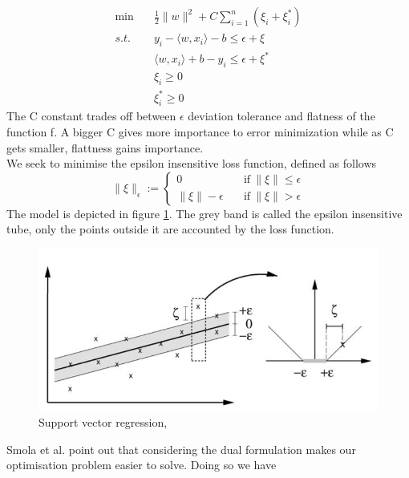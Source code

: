 \begin{equation}
    \begin{aligned}
        \min \quad& \frac{1}{2}\|w\|^2+C\sum\limits_{i=1}^n(\xi_i+\xi_i^*)
        \\
        s.t. \quad& y_i-\langle w, x_i\rangle-b\leq \epsilon+\xi
        \\
        \quad& \langle w, x_i\rangle +b-y_i\leq \epsilon+\xi^*
        \\
        \quad& \xi_i\geq0
        \\
        \quad& \xi_i^*\geq0
    \end{aligned}
\end{equation}
The C constant trades off between $\epsilon$ deviation tolerance and flatness of the function f. A bigger C gives more importance to error minimization while as C gets smaller, flattness gains importance.
\\
We seek to minimise the epsilon insensitive loss function, defined as follows
\begin{equation}
    \|\xi\|_\epsilon:=\begin{cases}
        0 \quad& \textrm{if} \ \|\xi\|\leq \epsilon
        \\
        \|\xi\|-\epsilon \quad& \textrm{if} \ \|\xi\| > \epsilon
    \end{cases}
\end{equation}
The model is depicted in figure \ref{fig:svm_simple}. The grey band is called the epsilon insensitive tube, only the points outside it are accounted by the loss function.
\begin{figure}
    \includegraphics[width=\textwidth]{images/svm_simple.png}    
    \caption{Support vector regression,\cite{learning_with_kernels}}
    \label{fig:svm_simple}
\end{figure}
Smola et al. \cite{smola2004tutorial} point out that considering the dual formulation makes our optimisation problem easier to solve. Doing so we have
